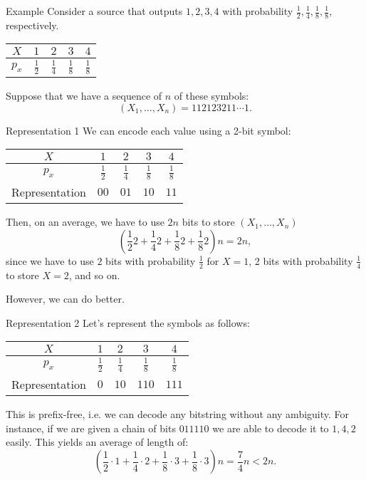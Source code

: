 \documentclass[a4paper]{article}
\begin{document}
\begin{parag}{Example}
    Consider a source that outputs $1, 2, 3, 4$ with probability $\frac{1}{2}, \frac{1}{4}, \frac{1}{8}, \frac{1}{8}$, respectively. 
    \begin{center}
    \begin{tabular}{c|cccc}
        $X$ & $1$ & $2$ & $3$ & $4$ \\ \hline
        $p_x$ & $\frac{1}{2}$ & $\frac{1}{4}$ & $\frac{1}{8}$ & $\frac{1}{8}$
    \end{tabular}
    \end{center}

    Suppose that we have a sequence of $n$ of these symbols:
    \[\left(X_1, \ldots, X_n\right) = 112123211\cdots1.\]
    
    \begin{subparag}{Representation 1}
        We can encode each value using a 2-bit symbol:
        \begin{center}
        \begin{tabular}{c|cccc}
            $X$ & $1$ & $2$ & $3$ & $4$ \\
            \hline
            $p_x$ & $\frac{1}{2}$ & $\frac{1}{4}$ & $\frac{1}{8}$ & $\frac{1}{8}$ \\
            Representation & $00$ & $01$ & $10$ & $11$
        \end{tabular}
        \end{center}
        
        Then, on an average, we have to use $2n$ bits to store $\left(X_1, \ldots, X_n\right)$ 
        \[\left(\frac{1}{2} 2 + \frac{1}{4} 2 + \frac{1}{8}2 + \frac{1}{8} 2\right) n = 2n,\]
        since we have to use $2$ bits with probability $\frac{1}{2}$ for $X = 1$, 2 bits with probability $\frac{1}{4}$ to store $X = 2$, and so on.

        However, we can do better.
    \end{subparag}

    \begin{subparag}{Representation 2}
        Let's represent the symbols as follows:
        \begin{center}
        \begin{tabular}{c|cccc}
            $X$ & $1$ & $2$ & $3$ & $4$ \\
            \hline
            $p_x$ & $\frac{1}{2}$ & $\frac{1}{4}$ & $\frac{1}{8}$ & $\frac{1}{8}$ \\
            Representation & $0$ & $10$ & $110$ & $111$
        \end{tabular}
        \end{center}
        
        This is prefix-free, i.e. we can decode any bitstring without any ambiguity. For instance, if we are given a chain of bits $011110$ we are able to decode it to $1, 4, 2$ easily. This yields an average of length of: 
        \[\left(\frac{1}{2}\cdot 1 + \frac{1}{4}\cdot 2 + \frac{1}{8}\cdot 3 + \frac{1}{8}\cdot 3\right) n = \frac{7}{4}n < 2n.\]
    \end{subparag}
\end{parag}
\end{document}
